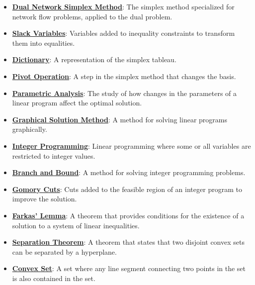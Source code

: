 \documentclass{article}%
\begin{document}
\begin{itemize}[leftmargin=*]
\item \href{https://www.math.purdue.edu/~yipn/421/2024-11-21-EconNetSimplex.pdf#page=7}{\textbf{Dual Network Simplex Method}}: The simplex method specialized for network flow problems, applied to the dual problem. %
\item \href{https://www.math.purdue.edu/~yipn/421/2024-11-21-EconNetSimplex.pdf#page=2}{\textbf{Slack Variables}}: Variables added to inequality constraints to transform them into equalities. %
\item \href{https://www.math.purdue.edu/~yipn/421/2024-11-21-EconNetSimplex.pdf#page=2}{\textbf{Dictionary}}: A representation of the simplex tableau. %
\item \href{https://www.math.purdue.edu/~yipn/421/2024-11-21-EconNetSimplex.pdf#page=7}{\textbf{Pivot Operation}}: A step in the simplex method that changes the basis. %
\item \href{https://www.math.purdue.edu/~yipn/421/2024-11-21-EconNetSimplex.pdf#page=8}{\textbf{Parametric Analysis}}: The study of how changes in the parameters of a linear program affect the optimal solution. %
\item \href{https://www.math.purdue.edu/~yipn/421/2024-11-21-EconNetSimplex.pdf#page=4}{\textbf{Graphical Solution Method}}: A method for solving linear programs graphically. %
\item \href{https://www.math.purdue.edu/~yipn/421/2024-11-21-EconNetSimplex.pdf#page=4}{\textbf{Integer Programming}}: Linear programming where some or all variables are restricted to integer values. %
\item \href{https://www.math.purdue.edu/~yipn/421/2024-11-21-EconNetSimplex.pdf#page=4}{\textbf{Branch and Bound}}: A method for solving integer programming problems. %
\item \href{https://www.math.purdue.edu/~yipn/421/2024-11-21-EconNetSimplex.pdf#page=4}{\textbf{Gomory Cuts}}: Cuts added to the feasible region of an integer program to improve the solution. %
\item \href{https://www.math.purdue.edu/~yipn/421/2024-11-21-EconNetSimplex.pdf#page=4}{\textbf{Farkas' Lemma}}: A theorem that provides conditions for the existence of a solution to a system of linear inequalities. %
\item \href{https://www.math.purdue.edu/~yipn/421/2024-11-21-EconNetSimplex.pdf#page=4}{\textbf{Separation Theorem}}: A theorem that states that two disjoint convex sets can be separated by a hyperplane. %
\item \href{https://www.math.purdue.edu/~yipn/421/2024-11-21-EconNetSimplex.pdf#page=4}{\textbf{Convex Set}}: A set where any line segment connecting two points in the set is also contained in the set. %

\end{itemize}
\end{document}
